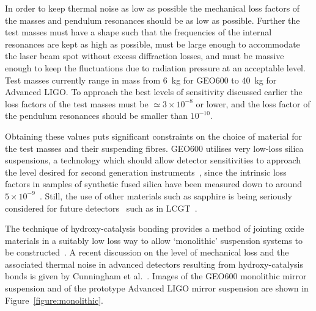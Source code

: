 \documentclass{article}
\begin{document}
In order to keep thermal noise as low as possible the mechanical loss factors of
the masses and pendulum resonances should be as low as possible. Further the
test masses must have a shape such that the frequencies of the internal
resonances are kept as high as possible, must be large enough to accommodate the
laser beam spot without excess diffraction losses, and must be massive enough to
keep the fluctuations due to radiation pressure at an acceptable level. Test
masses currently range in mass from 6~kg for GEO600 to 40~kg for Advanced LIGO.
To approach the best levels of sensitivity discussed earlier the loss factors of
the test masses must be $\simeq 3 \times 10^{-8}$ or lower, and the loss factor
of the pendulum resonances should be smaller than $10^{-10}$.

Obtaining these values puts significant constraints on the choice of material
for the test masses and their suspending fibres. GEO600 utilises very low-loss
silica suspensions, a technology which should allow detector sensitivities to
approach the level desired for second generation instruments~\cite{Braginsky1,
Rowan1, Rowan2}, since the intrinsic loss factors in samples of synthetic fused
silica have been measured down to around $5\times 10^{-9}$~\cite{Ageev:2004}.
Still, the use of other materials such as sapphire is being seriously considered
for future detectors~\cite{Braginsky2, Ju2, Rowan1} such as in
LCGT~\cite{Miyoki:2005, Ohashi:2008}.

The technique of hydroxy-catalysis bonding provides a method of jointing oxide
materials in a suitably low loss way to allow `monolithic' suspension systems to
be constructed~\cite{Rowan3}. A recent discussion on the level of mechanical
loss and the associated thermal noise in advanced detectors resulting from
hydroxy-catalysis bonds is given by Cunningham et al.~\cite{Cunningham:2010}.
Images of the GEO600 monolithic mirror suspension and of the prototype Advanced
LIGO mirror suspension are shown in Figure~\ref{figure:monolithic}.

\end{document}
